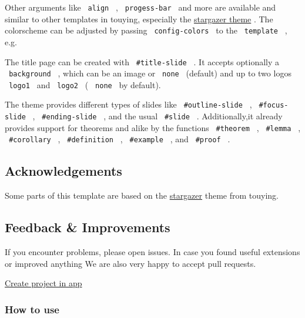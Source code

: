Other arguments like \texttt{\ align\ } , \texttt{\ progess-bar\ } and
more are available and similar to other templates in touying, especially
the \href{https://touying-typ.github.io/docs/themes/stargazer}{stargazer
theme} . The colorscheme can be adjusted by passing
\texttt{\ config-colors\ } to the \texttt{\ template\ } , e.g.

\begin{Shaded}
\begin{Highlighting}[]
\NormalTok{)}
\end{Highlighting}
\end{Shaded}

The title page can be created with \texttt{\ \#title-slide\ } . It
accepts optionally a \texttt{\ background\ } , which can be an image or
\texttt{\ none\ } (default) and up to two logos \texttt{\ logo1\ } and
\texttt{\ logo2\ } ( \texttt{\ none\ } by default).

The theme provides different types of slides like
\texttt{\ \#outline-slide\ } , \texttt{\ \#focus-slide\ } ,
\texttt{\ \#ending-slide\ } , and the usual \texttt{\ \#slide\ } .
Additionally,it already provides support for theorems and alike by the
functions \texttt{\ \#theorem\ } , \texttt{\ \#lemma\ } ,
\texttt{\ \#corollary\ } , \texttt{\ \#definition\ } ,
\texttt{\ \#example\ } , and \texttt{\ \#proof\ } .

\subsection{Acknowledgements}\label{acknowledgements}

Some parts of this template are based on the
\href{https://github.com/touying-typ/touying/blob/main/themes/stargazer.typ}{stargazer}
theme from touying.

\subsection{Feedback \& Improvements}\label{feedback-improvements}

If you encounter problems, please open issues. In case you found useful
extensions or improved anything We are also very happy to accept pull
requests.

\href{/app?template=clean-math-presentation&version=0.1.0}{Create
project in app}

\subsubsection{How to use}\label{how-to-use}

